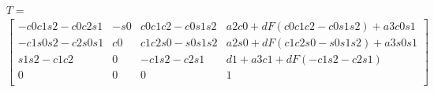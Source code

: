 \documentclass[./\jobname.tex]{subfiles}
\begin{document}
\begin{figure}[H]
	\centering
	\noindent{}
	\label{fig:robot_coord}
\end{figure}





\begin{table}[H]
	\centering
	\noindent{}
	\label{tab:link_params}
\end{table}



\begin{equation}
\label{eq:transformationmatrix}
\begin{split}
& T =  \\
& \begin{bmatrix}
-c0c1s2 -c0c2s1 & -s0 & c0c1c2 - c0s1s2 & a2c0 + dF (c0c1c2 - c0s1s2) + a3c0s1 \\
-c1s0s2 -c2s0s1 &  c0 & c1c2s0 - s0s1s2 & a2s0 + dF (c1c2s0 - s0s1s2) + a3s0s1 \\
s1s2 - c1c2     &   0 & -c1s2 - c2s1 & d1 + a3c1 + dF(-c1s2 - c2s1) \\
0               &   0 & 0 & 1 \\
\end{bmatrix}\\
\end{split}
\end{equation}
\end{document}

